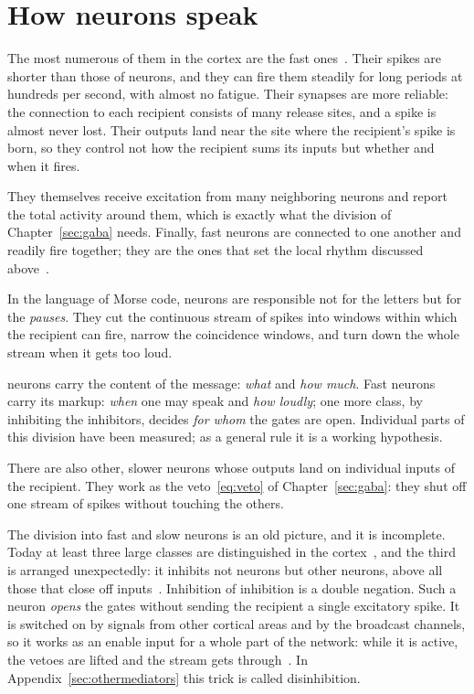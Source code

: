 \section{How  neurons speak}

The most numerous of them in the cortex are the fast ones~\cite{Tremblay2016}. Their spikes are shorter than those of  neurons, and they can fire them steadily for long periods at hundreds per second, with almost no fatigue. Their synapses are more reliable: the connection to each recipient consists of many release sites, and a spike is almost never lost. Their outputs land near the site where the recipient's spike is born, so they control not how the recipient sums its inputs but whether and when it fires.

They themselves receive excitation from many neighboring  neurons and report the total activity around them, which is exactly what the division of Chapter~\ref{sec:gaba} needs. Finally, fast  neurons are connected to one another and readily fire together; they are the ones that set the local rhythm discussed above~\cite{Cardin2009}.

In the language of Morse code,  neurons are responsible not for the letters but for the \emph{pauses}. They cut the continuous stream of  spikes into windows within which the recipient can fire, narrow the coincidence windows, and turn down the whole stream when it gets too loud.

\begin{keyblock}
\begin{proposition}
\label{prop:punctuation}
 neurons carry the content of the message: \emph{what} and \emph{how much}. Fast  neurons carry its markup: \emph{when} one may speak and \emph{how loudly}; one more class, by inhibiting the inhibitors, decides \emph{for whom} the gates are open. Individual parts of this division have been measured; as a general rule it is a working hypothesis.
\end{proposition}
\end{keyblock}

There are also other, slower  neurons whose outputs land on individual inputs of the recipient. They work as the veto~\eqref{eq:veto} of Chapter~\ref{sec:gaba}: they shut off one stream of  spikes without touching the others.

The division into fast and slow  neurons is an old picture, and it is incomplete. Today at least three large classes are distinguished in the cortex~\cite{Tremblay2016}, and the third is arranged unexpectedly: it inhibits not  neurons but other  neurons, above all those that close off inputs~\cite{Pfeffer2013}. Inhibition of inhibition is a double negation. Such a neuron \emph{opens} the gates without sending the recipient a single excitatory spike. It is switched on by signals from other cortical areas and by the broadcast channels, so it works as an enable input for a whole part of the network: while it is active, the vetoes are lifted and the stream gets through~\cite{Pi2013}. In Appendix~\ref{sec:othermediators} this trick is called disinhibition.
